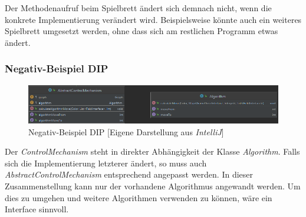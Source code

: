 \newpage 
\noindent Der Methodenaufruf beim Spielbrett ändert sich demnach nicht, wenn die konkrete Implementierung verändert wird. Beispielsweise könnte auch ein weiteres Spielbrett umgesetzt werden, ohne dass sich am restlichen Programm etwas ändert.

\subsubsection{Negativ-Beispiel DIP}
\begin{figure}[htbp]
\centering
\centerline{\includegraphics[scale=.6]{negativbeispiel_dip}}
\caption{Negativ-Beispiel DIP [Eigene Darstellung aus \emph{IntelliJ}]}
\label{fig:negativbeispiel_dip}
\end{figure}
\noindent Der \emph{ControlMechanism} steht in direkter Abhängigkeit der Klasse \emph{Algorithm}. Falls sich die Implementierung letzterer ändert, so muss auch \emph{AbstractControlMechanism} entsprechend angepasst werden. In dieser Zusammenstellung kann nur der vorhandene Algorithmus angewandt werden. Um dies zu umgehen und weitere Algorithmen verwenden zu können, wäre ein Interface sinnvoll.